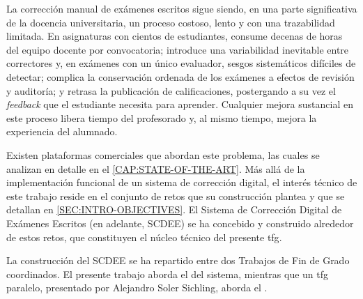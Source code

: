 La corrección manual de exámenes escritos sigue siendo, en una parte
significativa de la docencia universitaria, un proceso costoso, lento y
con una trazabilidad limitada. En asignaturas con cientos de estudiantes,
consume decenas de horas del equipo docente por convocatoria; introduce
una variabilidad inevitable entre correctores y, en exámenes con un único
evaluador, sesgos sistemáticos difíciles de detectar; complica la
conservación ordenada de los exámenes a efectos de revisión y auditoría; y
retrasa la publicación de calificaciones, postergando a su vez el
\textit{feedback} que el estudiante necesita para aprender. Cualquier
mejora sustancial en este proceso libera tiempo del profesorado y, al mismo
tiempo, mejora la experiencia del alumnado.

Existen plataformas comerciales que abordan este problema, las cuales se
analizan en detalle en el \cref{CAP:STATE-OF-THE-ART}. Más allá de la
implementación funcional de un sistema de corrección digital, el interés
técnico de este trabajo reside en el conjunto de retos que su construcción
plantea y que se detallan en \ref{SEC:INTRO-OBJECTIVES}. El Sistema de
Corrección Digital de Exámenes Escritos (en adelante, SCDEE) se ha
concebido y construido alrededor de estos retos, que constituyen el núcleo
técnico del presente \acs{tfg}.

La construcción del SCDEE se ha repartido entre dos Trabajos de Fin de
Grado coordinados. El presente trabajo aborda el  del sistema,
mientras que un \acs{tfg} paralelo, presentado por Alejandro Soler
Sichling, aborda el .
